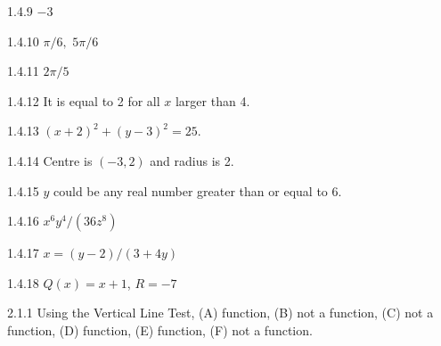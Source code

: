 \begin{Answer}{1.4.9}
	$-3$
\end{Answer}
\begin{Answer}{1.4.10}
	$\pi /6,$ $5\pi /6$
\end{Answer}
\begin{Answer}{1.4.11}
	$2\pi/5$
\end{Answer}
\begin{Answer}{1.4.12}
	It is equal to 2 for all $x$ larger than 4.
\end{Answer}
\begin{Answer}{1.4.13}
	$(x+2)^2+(y-3)^2=25$.
\end{Answer}
\begin{Answer}{1.4.14}
	Centre is $(-3,2)$ and radius is 2.
\end{Answer}
\begin{Answer}{1.4.15}
	$y$ could be any real number greater than or equal to 6.
\end{Answer}
\begin{Answer}{1.4.16}
	$x^6 y^4/(36z^8)$
\end{Answer}
\begin{Answer}{1.4.17}
	$x=(y-2)/(3+4y)$
\end{Answer}
\begin{Answer}{1.4.18}
	$Q(x)=x+1$, $R=-7$
\end{Answer}
\begin{Answer}{2.1.1}
	Using the Vertical Line Test,
	(A) function, \hspace{3mm} (B) not a function, \hspace{3mm} (C) not a function, \hspace{3mm} (D) function, \hspace{3mm} (E) function, \hspace{3mm} (F) not a function.
\end{Answer}

